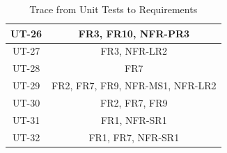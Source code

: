 \documentclass[12pt, titlepage]{article}
\begin{document}
\begin{table}[H]
\begin{tabular}{|c|c|}
  UT-26         & FR3, FR10, NFR-PR3          \\ \hline
  UT-27         & FR3, NFR-LR2                \\ \hline
  UT-28         & FR7                         \\ \hline
  UT-29         & FR2, FR7, FR9, NFR-MS1, NFR-LR2 \\ \hline
  UT-30         & FR2, FR7, FR9               \\ \hline
  UT-31         & FR1, NFR-SR1                \\ \hline
  UT-32         & FR1, FR7, NFR-SR1           \\ \hline
  \end{tabular}
  \caption{Trace from Unit Tests to Requirements  \citep{SRS}} 
  \label{tab:ut-req-trace}
  \end{table}
\end{document}
